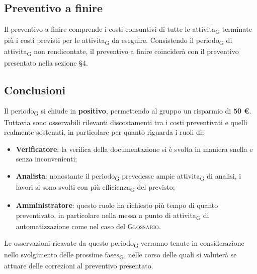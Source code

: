 \subsection{Preventivo a finire}
Il preventivo a finire comprende i costi consuntivi di tutte le \gls{attivita}\textsubscript{G} terminate più i costi previsti per le \gls{attivita}\textsubscript{G} da eseguire. Consistendo il \gls{periodo}\textsubscript{G} di \gls{attivita}\textsubscript{G} non rendicontate, il preventivo a finire coinciderà con il preventivo presentato nella sezione \S 4.



\subsection{Conclusioni}

Il \gls{periodo}\textsubscript{G} si chiude in \textbf{positivo}, permettendo al gruppo un risparmio di \textbf{50 \euro{}}. Tuttavia sono osservabili rilevanti discostamenti tra i costi preventivati e quelli realmente sostenuti, in particolare per quanto riguarda i ruoli di:
\begin{itemize}
	\item \textbf{Verificatore}: la verifica della documentazione si è svolta in maniera snella e senza inconvenienti;
	\item \textbf{Analista}: nonostante il \gls{periodo}\textsubscript{G} prevedesse ampie \gls{attivita}\textsubscript{G} di analisi, i lavori si sono svolti con più \gls{efficienza}\textsubscript{G} del previsto;
	\item \textbf{Amministratore}: questo ruolo ha richiesto più tempo di quanto preventivato, in particolare nella messa a punto di \gls{attivita}\textsubscript{G} di automatizzazione come nel caso del \textsc{Glossario}.
\end{itemize}
Le osservazioni ricavate da questo \gls{periodo}\textsubscript{G} verranno tenute in considerazione nello svolgimento delle prossime \glspl{fase}\textsubscript{G}, nelle corso delle quali si valuterà se attuare delle correzioni al preventivo presentato.
